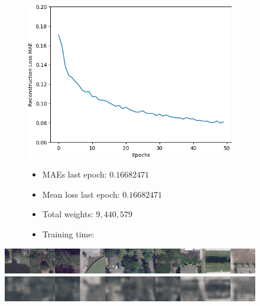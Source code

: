 \begin{figure}[H]
    \centering
    \begin{subfigure}{.5\textwidth}
        \centering
        \includegraphics[width=\textwidth]
        {images/figures/experiments_architecture/mae_graphKernel3adjusted2x2x256_dim1024.png}
    \end{subfigure}%
    \begin{subfigure}{.5\textwidth}
      \begin{itemize}
          \item MAEs last epoch: $0.16682471$
          \item Mean loss last epoch: $0.16682471$
          \item Total weights: $9,440,579$
          \item Training time:
      \end{itemize}
    \end{subfigure}
\end{figure}

\vspace{-2em}

\begin{figure}[H]
    \centering
    \includegraphics[width=\textwidth]
    {images/figures/experiments_architecture/inputsKernel3adjusted2x2x256_dim1024.png}
    \includegraphics[width=\textwidth]
    {images/figures/experiments_architecture/reconstructionsKernel3adjusted2x2x256_dim1024.png}
\end{figure}

